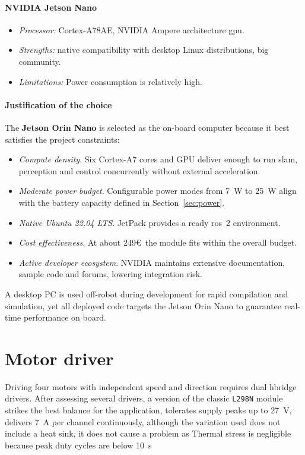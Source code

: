 \paragraph*{NVIDIA Jetson Nano}
\begin{itemize}
  \item \emph{Processor:} Cortex-A78AE, NVIDIA Ampere architecture \gls{gpu}.
  \item \emph{Strengths:} native compatibility with desktop Linux distributions, big community.
  \item \emph{Limitations:} Power consumption is relatively high.
\end{itemize}

\paragraph*{Justification of the choice}
The \textbf{Jetson Orin Nano} is selected as the on-board computer because it best satisfies the project constraints:

\begin{itemize}
  \item \textit{Compute density}. Six Cortex-A7 cores and GPU deliver enough to run \gls{slam}, perception and control concurrently without external acceleration.
  \item \textit{Moderate power budget}. Configurable power modes from \SI{7}{\watt} to \SI{25}{\watt} align with the battery capacity defined in Section~\ref{sec:power}.
  \item \textit{Native Ubuntu 22.04 LTS}. JetPack provides a ready \gls{ros}~2 environment.
  \item \textit{Cost effectiveness}. At about 249\euro~the module fits within the overall budget.
  \item \textit{Active developer ecosystem}. NVIDIA maintains extensive documentation, sample code and forums, lowering integration risk.
\end{itemize}

A desktop PC is used off-robot during development for rapid compilation and simulation, yet all deployed code targets the Jetson Orin Nano to guarantee real-time performance on board.

\section{Motor driver}

Driving four motors with independent speed and direction requires dual \gls{hbridge} drivers. After assessing several drivers, a version of the classic \texttt{L298N} module strikes the best balance for the application, tolerates supply peaks up to \SI{27}{\volt}, delivers \SI{7}{\ampere} per channel continuously, although the variation used does not include a heat sink, it does not cause a problem as Thermal stress is negligible because peak duty cycles are below \SI{10}{\second}

